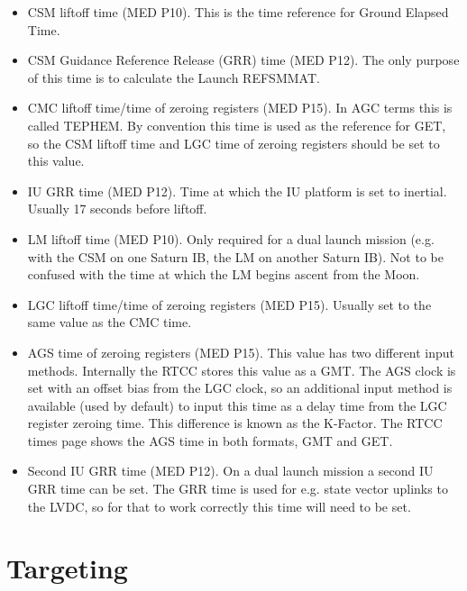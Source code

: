 \documentclass[11pt]{article} %
\begin{document}
\begin{itemize}
	\item CSM liftoff time (MED P10). This is the time reference for Ground Elapsed Time.
	\item CSM Guidance Reference Release (GRR) time (MED P12). The only purpose of this time is to calculate the Launch REFSMMAT.
	\item CMC liftoff time/time of zeroing registers (MED P15). In AGC terms this is called TEPHEM. By convention this time is used as the reference for GET, so the CSM liftoff time and LGC time of zeroing registers should be set to this value.
	\item IU GRR time (MED P12). Time at which the IU platform is set to inertial. Usually 17 seconds before liftoff.
	\item LM liftoff time (MED P10). Only required for a dual launch mission (e.g. with the CSM on one Saturn IB, the LM on another Saturn IB). Not to be confused with the time at which the LM begins ascent from the Moon.
	\item LGC liftoff time/time of zeroing registers (MED P15). Usually set to the same value as the CMC time.
	\item AGS time of zeroing registers (MED P15). This value has two different input methods. Internally the RTCC stores this value as a GMT. The AGS clock is set with an offset bias from the LGC clock, so an additional input method is available (used by default) to input this time as a delay time from the LGC register zeroing time. This difference is known as the K-Factor. The RTCC times page shows the AGS time in both formats, GMT and GET.
	\item Second IU GRR time (MED P12). On a dual launch mission a second IU GRR time can be set. The GRR time is used for e.g. state vector uplinks to the LVDC, so for that to work correctly this time will need to be set.
\end{itemize}
\newpage
\section{Targeting}
\end{document}
